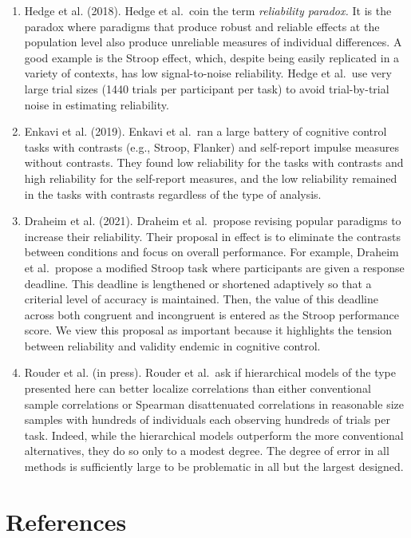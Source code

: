 \documentclass[
  ,man]{apa6}
\begin{document}
\begin{enumerate}
\def\labelenumi{\arabic{enumi}.}
\item
  Hedge et al. (2018). Hedge et al.~coin the term \emph{reliability paradox.} It is the paradox where paradigms that produce robust and reliable effects at the population level also produce unreliable measures of individual differences. A good example is the Stroop effect, which, despite being easily replicated in a variety of contexts, has low signal-to-noise reliability. Hedge et al.~use very large trial sizes (1440 trials per participant per task) to avoid trial-by-trial noise in estimating reliability.
\item
  Enkavi et al. (2019). Enkavi et al.~ran a large battery of cognitive control tasks with contrasts (e.g., Stroop, Flanker) and self-report impulse measures without contrasts. They found low reliability for the tasks with contrasts and high reliability for the self-report measures, and the low reliability remained in the tasks with contrasts regardless of the type of analysis.
\item
  Draheim et al. (2021). Draheim et al.~propose revising popular paradigms to increase their reliability. Their proposal in effect is to eliminate the contrasts between conditions and focus on overall performance. For example, Draheim et al.~propose a modified Stroop task where participants are given a response deadline. This deadline is lengthened or shortened adaptively so that a criterial level of accuracy is maintained. Then, the value of this deadline across both congruent and incongruent is entered as the Stroop performance score. We view this proposal as important because it highlights the tension between reliability and validity endemic in cognitive control.
\item
  Rouder et al. (in press). Rouder et al.~ask if hierarchical models of the type presented here can better localize correlations than either conventional sample correlations or Spearman disattenuated correlations in reasonable size samples with hundreds of individuals each observing hundreds of trials per task. Indeed, while the hierarchical models outperform the more conventional alternatives, they do so only to a modest degree. The degree of error in all methods is sufficiently large to be problematic in all but the largest designed.
\end{enumerate}

\newpage

\hypertarget{references}{%
\section*{References}\label{references}}
\end{document}
